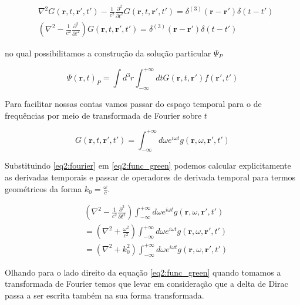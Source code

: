\begin{equation}
	\begin{split}
	&\nabla^2 G(\textbf{r}, t, \textbf{r}', t')  -\frac{1}{c^2}\frac{\partial^2}{\partial t^2}G(\textbf{r}, t, \textbf{r}', t') = 
	\delta^{(3)}(\textbf{r}-\textbf{r}') \delta (t-t') 
	\\
	&\left( \nabla^2 -\frac{1}{c^2}\frac{\partial^2}{\partial t^2}\right)  G(\textbf{r}, t, \textbf{r}', t') =
	\delta^{(3)}(\textbf{r}-\textbf{r}') \delta (t-t')
	\end{split}
	\label{eq2:func_green}
\end{equation}

no qual possibilitamos a construção da solução particular $\Psi_P$

\begin{equation}
	\Psi (\textbf{r}, t)_P= 
	\int d^3 r \int_{-\infty}^{+\infty} dt G(\textbf{r}, t, \textbf{r}') f(\textbf{r}', t')
	\label{eq2:psi}
\end{equation}

Para facilitar nossas contas vamos passar do espaço temporal para o de frequências por meio de transformada de Fourier sobre $t$

\begin{equation}
	G(\textbf{r},t, \textbf{r}', t') = 
	\int_{-\infty}^{+\infty} d\omega e^{i\omega t} g(\textbf{r},\omega, \textbf{r}', t')
	\label{eq2:fourier}
\end{equation}

Substituindo \ref{eq2:fourier} em \ref{eq2:func_green} podemos calcular explicitamente as derivadas temporais e passar de operadores de derivada temporal para termos geométricos da forma $k_0 = \frac{\omega}{c}$.

\begin{equation}
	\begin{split}
	& \left( \nabla^2-\frac{1}{c^2}\frac{\partial^2}{\partial t^2}\right) 
	\int_{-\infty}^{+\infty} d\omega e^{i\omega t} g(\textbf{r},\omega, \textbf{r}', t')\\
	& = \left( \nabla^2 + \frac{\omega^2}{c^2}\right)
	\int_{-\infty}^{+\infty} d\omega e^{i\omega t} g(\textbf{r},\omega, \textbf{r}', t')\\
	& = \left( \nabla^2 + k_0^2\right) \int_{-\infty}^{+\infty} d\omega e^{i\omega t} g(\textbf{r},\omega, \textbf{r}', t')
	\end{split}
\end{equation}

Olhando para o lado direito da equação \ref{eq2:func_green} quando tomamos a transformada de Fourier temos que levar em consideração que a delta de Dirac passa a ser escrita também na sua forma transformada.


